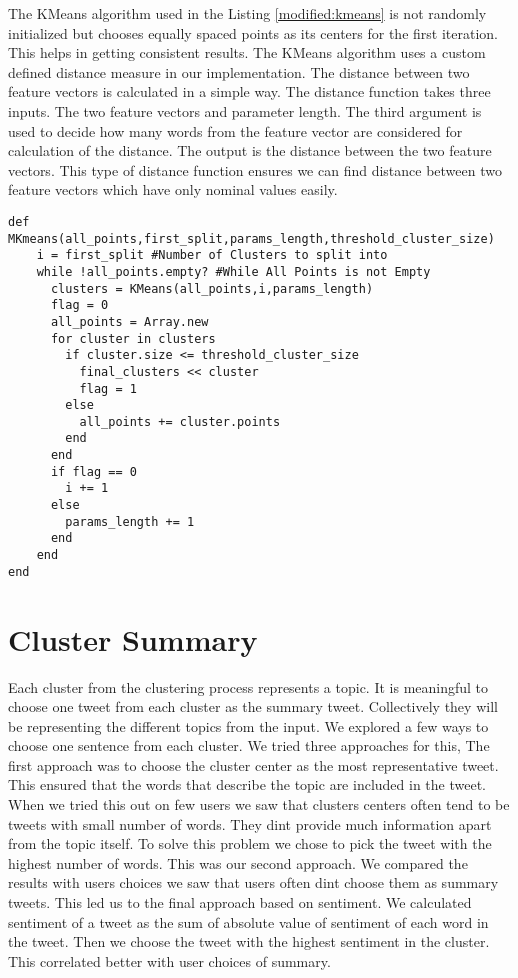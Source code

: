 The KMeans algorithm used in the Listing \ref{modified:kmeans} is not randomly initialized but chooses equally spaced points as its centers for the first iteration. This helps in getting consistent results. The KMeans algorithm uses a custom defined distance measure in our implementation. The distance between two feature vectors is calculated in a simple way. The distance function takes three inputs. The two feature vectors and parameter length. The third argument is used to decide how many words from the feature vector are considered for calculation of the distance. The output is the distance between the two feature vectors. This type of distance function ensures we can find distance between two feature vectors which have only nominal values easily.

\begin{lstlisting}
def MKmeans(all_points,first_split,params_length,threshold_cluster_size)
    i = first_split #Number of Clusters to split into
    while !all_points.empty? #While All Points is not Empty
      clusters = KMeans(all_points,i,params_length)
      flag = 0
      all_points = Array.new
      for cluster in clusters
        if cluster.size <= threshold_cluster_size
          final_clusters << cluster
          flag = 1
        else
          all_points += cluster.points
        end
      end
      if flag == 0
        i += 1
      else
        params_length += 1
      end
    end
end
\end{lstlisting}

\section{Cluster Summary}

Each cluster from the clustering process represents a topic. It is meaningful to choose one tweet from each cluster as the summary tweet. Collectively they will be representing the different topics from the input. We explored a few ways to choose one sentence from each cluster. We tried three approaches for this, The first approach was to choose the cluster center as the most representative tweet. This ensured that the words that describe the topic are included in the tweet. When we tried this out on few users we saw that clusters centers often tend to be tweets with small number of words. They dint provide much information apart from the topic itself. To solve this problem we chose to pick the tweet with the highest number of words. This was our second approach. We compared the results with users choices we saw that users often dint choose them as summary tweets. This led us to the final approach based on sentiment. We calculated sentiment of a tweet as the sum of absolute value of sentiment of each word in the tweet. Then we choose the tweet with the highest sentiment in the cluster. This correlated better with user choices of summary. 

